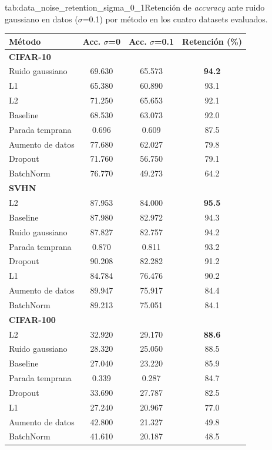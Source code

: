 \begin{table}{tab:data_noise_retention_sigma_0_1}{Retención de \textit{accuracy} ante ruido gaussiano en datos ($\sigma$=0.1) por método en los cuatro datasets evaluados.}
\small
\begin{tabular}{lccc}
\toprule
\textbf{Método} & \textbf{Acc. $\sigma$=0} & \textbf{Acc. $\sigma$=0.1} & \textbf{Retención (\%)} \\
\midrule
\multicolumn{4}{l}{\textbf{CIFAR-10}}\\
\midrule
Ruido gaussiano & 69.630 & 65.573 & \textbf{94.2} \\
L1 & 65.380 & 60.890 & 93.1 \\
L2 & 71.250 & 65.653 & 92.1 \\
Baseline & 68.530 & 63.073 & 92.0 \\
Parada temprana & 0.696 & 0.609 & 87.5 \\
Aumento de datos & 77.680 & 62.027 & 79.8 \\
Dropout & 71.760 & 56.750 & 79.1 \\
BatchNorm & 76.770 & 49.273 & 64.2 \\
\midrule
\multicolumn{4}{l}{\textbf{SVHN}}\\
\midrule
L2 & 87.953 & 84.000 & \textbf{95.5} \\
Baseline & 87.980 & 82.972 & 94.3 \\
Ruido gaussiano & 87.827 & 82.757 & 94.2 \\
Parada temprana & 0.870 & 0.811 & 93.2 \\
Dropout & 90.208 & 82.282 & 91.2 \\
L1 & 84.784 & 76.476 & 90.2 \\
Aumento de datos & 89.947 & 75.917 & 84.4 \\
BatchNorm & 89.213 & 75.051 & 84.1 \\
\midrule
\multicolumn{4}{l}{\textbf{CIFAR-100}}\\
\midrule
L2 & 32.920 & 29.170 & \textbf{88.6} \\
Ruido gaussiano & 28.320 & 25.050 & 88.5 \\
Baseline & 27.040 & 23.220 & 85.9 \\
Parada temprana & 0.339 & 0.287 & 84.7 \\
Dropout & 33.690 & 27.787 & 82.5 \\
L1 & 27.240 & 20.967 & 77.0 \\
Aumento de datos & 42.800 & 21.327 & 49.8 \\
BatchNorm & 41.610 & 20.187 & 48.5 \\

\end{tabular}
\end{table}
